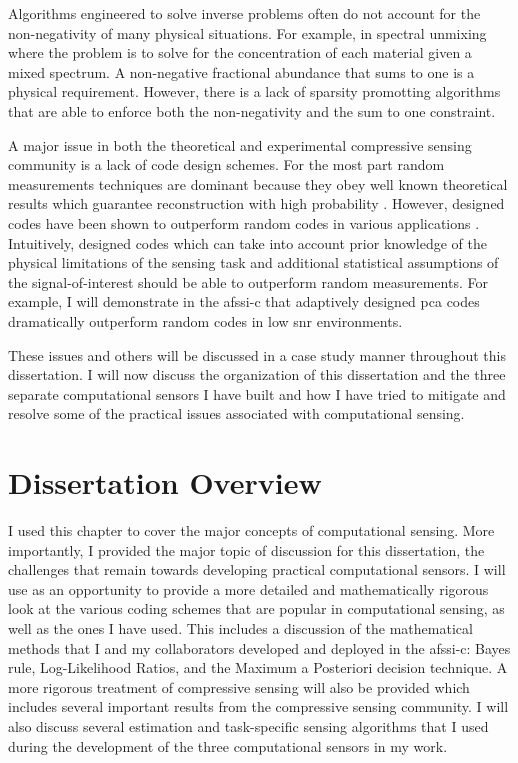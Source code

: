 Algorithms engineered to solve inverse problems often do not account for the non-negativity of many physical situations. For example, in spectral unmixing where the problem is to solve for the concentration of each material given a mixed spectrum. A non-negative fractional abundance that sums to one is a physical requirement. However, there is a lack of sparsity promotting algorithms that are able to enforce both the non-negativity and the sum to one constraint. 

A major issue in both the theoretical and experimental compressive sensing community is a lack of code design schemes. For the most part random measurements techniques are dominant because they obey well known theoretical results which guarantee reconstruction with high probability \cite{donoho2006compressed, candes2008introduction, tropp2006just}. However, designed codes have been shown to outperform random codes in various applications \cite{dinakarababu2011adaptive, pal2005face, dunlop2016experimental, ashok2011compressive, li2014realization}. Intuitively, designed codes which can take into account prior knowledge of the physical limitations of the sensing task and additional statistical assumptions of the signal-of-interest should be able to outperform random measurements. For example, I will demonstrate in the \gls{afssi-c} that adaptively designed \gls{pca} codes dramatically outperform random codes in low \gls{snr} environments. 

These issues and others will be discussed in a case study manner throughout this dissertation. I will now discuss the organization of this dissertation and the three separate computational sensors I have built and how I have tried to mitigate and resolve some of the practical issues associated with computational sensing.

\section{Dissertation Overview}

I used this chapter to cover the major concepts of computational sensing. More importantly, I provided the major topic of discussion for this dissertation, the challenges that remain towards developing practical computational sensors. I will use  as an opportunity to provide a more detailed and mathematically rigorous look at the various coding schemes that are popular in computational sensing, as well as the ones I have used. This includes a discussion of the mathematical methods that I and my collaborators developed and deployed in the \gls{afssi-c}: Bayes rule, Log-Likelihood Ratios, and the Maximum a Posteriori decision technique. A more rigorous treatment of compressive sensing will also be provided which includes several important results from the compressive sensing community. I will also discuss several estimation and task-specific sensing algorithms that I used during the development of the three computational sensors in my work.


